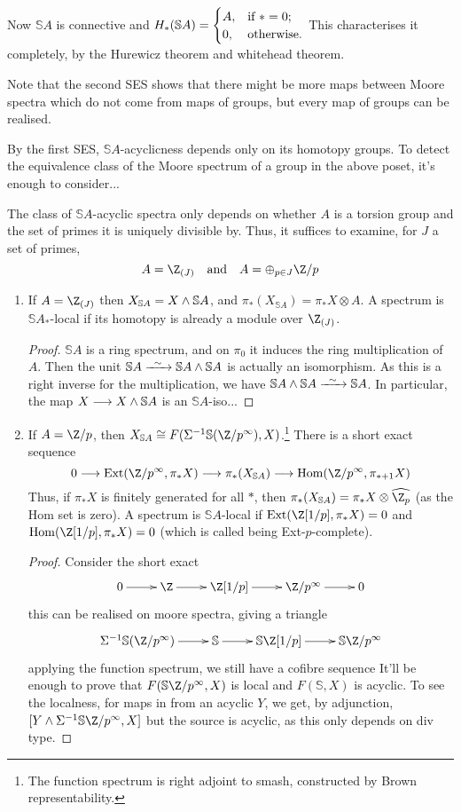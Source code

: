 \documentclass[11pt]{article}
\begin{document}
\begin{MarkusLocalisation}
\begin{exmp*}
Now $\mathbb{S}A$ is connective and $H_*(\mathbb{S}A)=\begin{cases}
A,&\textup{if }*=0;\\
0,&\textup{otherwise}.
\end{cases}$ This characterises it completely, by the Hurewicz theorem and whitehead theorem.

Note that the second SES shows that there might be more maps between Moore spectra which do not come from maps of groups, but every map of groups can be realised.
\end{exmp*}
By the first SES, $\mathbb{S}A$-acyclicness depends only on its homotopy groups. To detect the equivalence class of the Moore spectrum of a group in the above poset, it's enough to consider...

The class of $\mathbb{S}A$-acyclic spectra only depends on whether $A$ is a torsion group and the set of primes it is uniquely divisible by. Thus, it suffices to examine, for $J$ a set of primes,
\[A=\Z_{(J)}\textup{\quad and\quad }A=\oplus_{p\in J}\Z/p\]
\begin{enumerate}\squishlist
\item If $A=\Z_{(J)}$ then $X_{\mathbb{S}A}=X\wedge \mathbb{S}A$, and $\pi_*(X_{\mathbb{S}A})=\pi_*X\otimes A$. A spectrum is $\mathbb{S}A_*$-local if its homotopy is already a module over $\Z_{(J)}$.
\begin{proof}
$\mathbb{S}A$ is a ring spectrum, and on $\pi_0$ it induces the ring multiplication of $A$. Then the unit $\mathbb{S}A\weakequiv\mathbb{S}A \sprod\mathbb{S}A$ is actually an isomorphism. As this is a right inverse for the multiplication, we have $\mathbb{S}A\sprod\mathbb{S}A \weakequiv\mathbb{S}A$. In particular, the map $X\longrightarrow X\wedge \mathbb{S}A$ is an $\mathbb{S}A$-iso...
\end{proof}
\item If $A=\Z/p$, then $X_{\mathbb{S}A}\cong F(\Sigma^{-1}\mathbb{S}(\Z/p^\infty),X)$.\footnote{The function spectrum is right adjoint to smash, constructed by Brown representability.} There is a short exact sequence
\[0\to\Ext(\Z/p^\infty,\pi_{*}X)\to\pi_*(X_{\mathbb{S}A}) \to\Hom(\Z/p^\infty,\pi_{*+1}X)\]
Thus, if $\pi_*X$ is finitely generated for all $*$, then $\pi_*(X_{\mathbb{S}A})=\pi_{*}X\otimes \widehat{\Z_p}$ (as the Hom set is zero).
A spectrum is $\mathbb{S}A$-local if $\Ext(\Z[1/p],\pi_*X)=0$ and $\Hom(\Z[1/p],\pi_*X)=0$ (which is called being Ext-$p$-complete).
\begin{proof}
Consider the short exact
\[\xymatrix{
0\ar[r]&
\Z\ar[r]&
\Z[1/p]\ar[r]&
\Z/p^\infty\ar[r]&
0
}\]
this can be realised on moore spectra, giving a triangle
\[\xymatrix{
\Sigma^{-1}\mathbb{S}(\Z/p^\infty)\ar[r]&
\mathbb{S}\ar[r]&
\mathbb{S}\Z[1/p]\ar[r]&
\mathbb{S}\Z/p^\infty
}\]
applying the function spectrum, we still have a cofibre sequence
It'll be enough to prove that $F(\mathbb{S}\Z/p^\infty,X)$ is local and $F(\mathbb{S},X)$ is acyclic. To see the localness, for maps in from an acyclic $Y$, we get, by adjunction, $[Y\sprod \Sigma^{-1}\mathbb{S}\Z/p^\infty,X]$ but the source is acyclic, as this only depends on div type.


\end{proof}
\end{enumerate}
\end{MarkusLocalisation}
\end{document}

